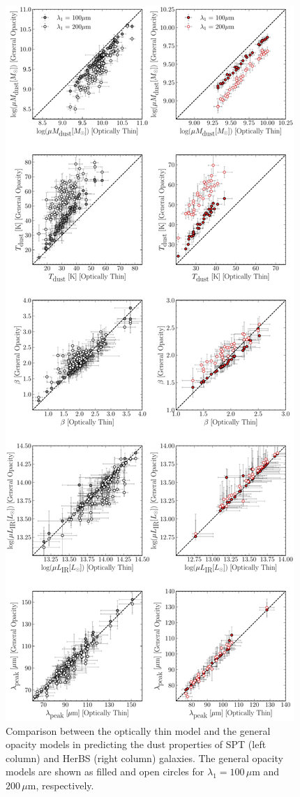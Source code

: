 \begin{figure}
	\centering
	\includegraphics[height=0.9\textheight]{Figures/Figure_4_6.pdf}
	\caption[Comparison of best fitting optically thin and general opacity parameters]{Comparison between the optically thin model and the general opacity models in predicting the dust properties of SPT (left column) and HerBS (right column) galaxies. The general opacity models are shown as filled and open circles for $\lambda_1 = 100\,\mu$m and $200\,\mu$m, respectively.}
	\label{fig:comparison_optically_thin_general_opacity}
\end{figure}


